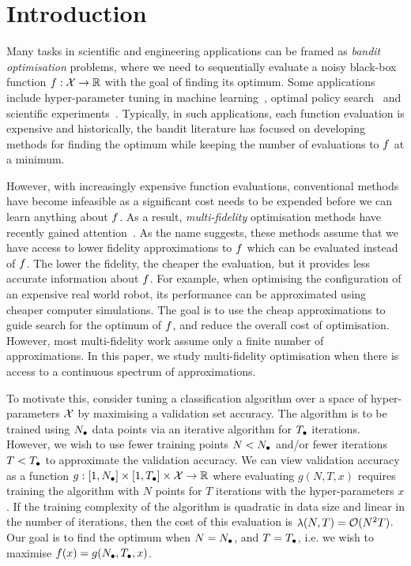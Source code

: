 
\section{Introduction}
\label{sec:intro}

Many tasks in scientific and engineering applications can be framed as \emph{bandit
optimisation} problems, where we need to sequentially evaluate a noisy
black-box function $f:\mathcal{X}\rightarrow\mathbb{R}$ with the goal of finding its optimum.
Some applications include hyper-parameter tuning in machine learning~\citep{%
snoek12practicalBO,hutter11smac}, optimal policy search~\citep{lizotte07automaticGait,
martinez07robotplanning} and scientific experiments~\citep{parkinson06wmap3,gonzalez14gene}.
Typically, in such applications, each function evaluation is expensive and historically,
the bandit literature has focused on developing methods for finding the optimum
while keeping the number of evaluations to $f$ at a minimum.

However, with increasingly expensive function evaluations, conventional methods have become
infeasible as a significant cost needs to be expended before we can learn anything
about $f$.
As a result, \emph{multi-fidelity} optimisation methods have recently gained
attention~\citep{kandasamy16mfbo,li2016hyperband,cutler14mfsim}.
As the name suggests, these methods assume that we have access to lower fidelity
approximations to $f$ which can be evaluated instead of $f$.
The lower the fidelity, the cheaper the evaluation, but it provides less accurate
information about $f$.
For example, when optimising the configuration of an expensive real world robot,
its performance can be approximated using cheaper computer simulations.
The goal is to use the cheap approximations to guide search for the optimum of $f$,
and reduce the overall cost of optimisation.
However, most multi-fidelity work assume only a finite number of approximations.
In this paper, we study multi-fidelity optimisation when there is access to a continuous
spectrum of approximations.



To motivate this,
consider tuning a classification algorithm over a space of hyper-parameters $\mathcal{X}$
by maximising a validation set accuracy. 
The algorithm is to be trained using $N_{{\bullet}}$
data points via an iterative algorithm for $T_{{\bullet}}$ iterations.
However, we wish to use fewer training points $N<N_{{\bullet}}$ and/or fewer iterations
$T<T_{{\bullet}}$ to approximate the validation accuracy.
We can view validation accuracy as a function
$g:[1,N_{{\bullet}}]\times[1,T_{{\bullet}}]\times\mathcal{X}\rightarrow\mathbb{R}$ where evaluating $g(N,T,x)$
requires training the algorithm with $N$ points for $T$ iterations with the
hyper-parameters $x$.
If the training complexity of the algorithm is quadratic in data size and linear in the
number of iterations, then the cost of this evaluation is $\lambda(N,T) = \mathcal{O}(N^2T)$.
Our goal is to find the optimum when $N=N_{{\bullet}}$, and $T=T_{{\bullet}}$,
i.e.  we wish to maximise $f(x) = g(N_{{\bullet}},T_{{\bullet}}, x)$.

